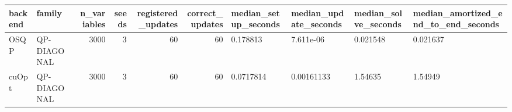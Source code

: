 \begin{table}
\label{tab:repeated-update}
\begin{tabular}{llrrrrllll}
\toprule
backend & family & n\_variables & seeds & registered\_updates & correct\_updates & median\_setup\_seconds & median\_update\_seconds & median\_solve\_seconds & median\_amortized\_end\_to\_end\_seconds \\
\midrule
OSQP & QP-DIAGONAL & 3000 & 3 & 60 & 60 & 0.178813 & 7.611e-06 & 0.021548 & 0.021637 \\
cuOpt & QP-DIAGONAL & 3000 & 3 & 60 & 60 & 0.0717814 & 0.00161133 & 1.54635 & 1.54949 \\
\bottomrule
\end{tabular}
\end{table}
